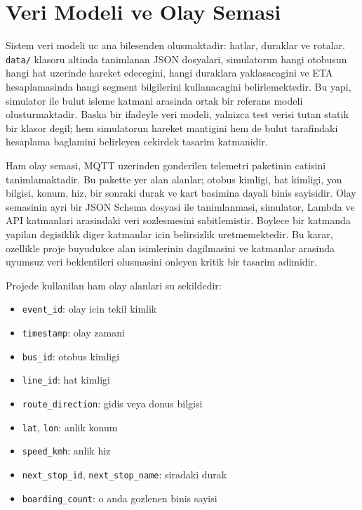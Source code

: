 \section{Veri Modeli ve Olay Semasi}

Sistem veri modeli uc ana bilesenden olusmaktadir: hatlar, duraklar ve rotalar. \texttt{data/} klasoru altinda tanimlanan JSON dosyalari, simulatorun hangi otobusun hangi hat uzerinde hareket edecegini, hangi duraklara yaklasacagini ve ETA hesaplamasinda hangi segment bilgilerini kullanacagini belirlemektedir. Bu yapi, simulator ile bulut isleme katmani arasinda ortak bir referans modeli olusturmaktadir. Baska bir ifadeyle veri modeli, yalnizca test verisi tutan statik bir klasor degil; hem simulatorun hareket mantigini hem de bulut tarafindaki hesaplama baglamini belirleyen cekirdek tasarim katmanidir.

Ham olay semasi, MQTT uzerinden gonderilen telemetri paketinin catisini tanimlamaktadir. Bu pakette yer alan alanlar; otobus kimligi, hat kimligi, yon bilgisi, konum, hiz, bir sonraki durak ve kart basimina dayali binis sayisidir. Olay semasinin ayri bir JSON Schema dosyasi ile tanimlanmasi, simulator, Lambda ve API katmanlari arasindaki veri sozlesmesini sabitlemistir. Boylece bir katmanda yapilan degisiklik diger katmanlar icin belirsizlik uretmemektedir. Bu karar, ozellikle proje buyudukce alan isimlerinin dagilmasini ve katmanlar arasinda uyumsuz veri beklentileri olusmasini onleyen kritik bir tasarim adimidir.

Projede kullanilan ham olay alanlari su sekildedir:

\begin{itemize}[leftmargin=*]
    \item \texttt{event\_id}: olay icin tekil kimlik
    \item \texttt{timestamp}: olay zamani
    \item \texttt{bus\_id}: otobus kimligi
    \item \texttt{line\_id}: hat kimligi
    \item \texttt{route\_direction}: gidis veya donus bilgisi
    \item \texttt{lat}, \texttt{lon}: anlik konum
    \item \texttt{speed\_kmh}: anlik hiz
    \item \texttt{next\_stop\_id}, \texttt{next\_stop\_name}: siradaki durak
    \item \texttt{boarding\_count}: o anda gozlenen binis sayisi
\end{itemize}

